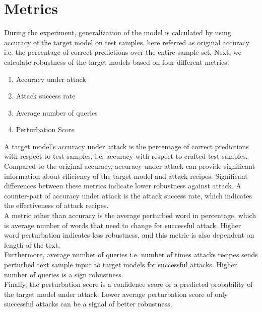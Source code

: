 \documentclass[%
	BCOR=8mm, %
	DIV=12,
	toc=bibliography, %
	toc=listof, %
	oneside, %
	egregdoesnotlikesansseriftitles, %
	]{scrbook}
\begin{document}
\section{Metrics}
\label{section:metrics}
During the experiment, generalization of the model is calculated by using accuracy of the target model on test samples, here referred as original accuracy i.e. the percentage of correct predictions over the entire sample set.
Next, we calculate robustness of the target models based on four different metrics: 
\begin{enumerate}
    \item Accuracy under attack 
    \item Attack success rate
    \item  Average number of queries
    \item Perturbation Score
\end{enumerate}
A target model's accuracy under attack is the percentage of correct predictions with respect to test samples, i.e. accuracy with respect to crafted test samples. Compared to the original accuracy, accuracy under attack can provide significant information about efficiency of the target model and attack recipes. Significant differences between these metrics indicate lower robustness against attack. A counter-part of accuracy under attack is the attack success rate, which indicates the effectiveness of attack recipes.\\
A metric other than accuracy is the average perturbed word in percentage, which is average number of words that need to change for successful attack. Higher word perturbation indicates less robustness, and this metric is also dependent on length of the text. \\
Furthermore, average number of queries i.e. number of times attacks recipes sends perturbed text sample input to target models for successful attacks. Higher number of queries is a sign robustness.\\
Finally, the perturbation score is a confidence score or a predicted probability of the target model under attack. Lower average perturbation score of only successful attacks can be a signal of better robustness. 
\end{document}
